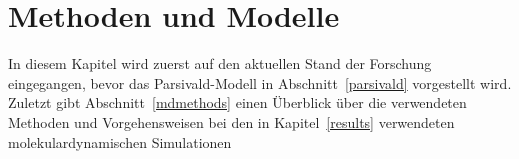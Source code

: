 \chapter{Methoden und Modelle}
\label{models}

In diesem Kapitel wird zuerst auf den aktuellen Stand der Forschung eingegangen, bevor das Parsivald-Modell in Abschnitt~\ref{parsivald} vorgestellt wird.
Zuletzt gibt Abschnitt~\ref{mdmethods} einen Überblick über die verwendeten Methoden und Vorgehensweisen bei den in Kapitel~\ref{results} verwendeten molekulardynamischen Simulationen


\clearpage

\clearpage


